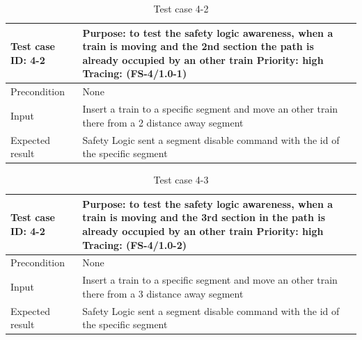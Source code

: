 \begin{table}[H]
	\caption{Test case 4-2}
	\label{table:TCase-FS4-2}
	\begin{center}
		\renewcommand{\arraystretch}{1.8}
		\begin{tabu} 
			to 0.9 \textwidth
			{  X[0.3, l] X[l] }
			\toprule
			Test case ID: 4-2 & Purpose: to test the safety logic awareness, when a train is moving and the 2nd section the path is already occupied by an other train \newline Priority: high \newline Tracing: (FS-4/1.0-1) \\ \midrule
			Precondition      & None                                                                                                                                                                                             \\
			Input             & Insert a train to a specific segment and move an other train there from a 2 distance away segment                                                                                                \\
			Expected result   & Safety Logic sent a segment disable command with the id of the specific segment                                                                                                                  \\ \bottomrule
		\end{tabu}
	\end{center}
\end{table} 

\begin{table}[H]
	\caption{Test case 4-3}
	\label{table:TCase-FS4-3}
	\begin{center}
		\renewcommand{\arraystretch}{1.8}
		\begin{tabu} 
			to 0.9 \textwidth
			{  X[0.3, l] X[l] }
			\toprule
			Test case ID: 4-2 & Purpose: to test the safety logic awareness, when a train is moving and the 3rd section in the path is already occupied by an other train \newline Priority: high \newline Tracing: (FS-4/1.0-2) \\ \midrule
			Precondition      & None                                                                                                                                                                                             \\
			Input             & Insert a train to a specific segment and move an other train there from a 3 distance away segment                                                                                                \\
			Expected result   & Safety Logic sent a segment disable command with the id of the specific segment                                                                                                                  \\ \bottomrule
		\end{tabu}
	\end{center}
\end{table} 

